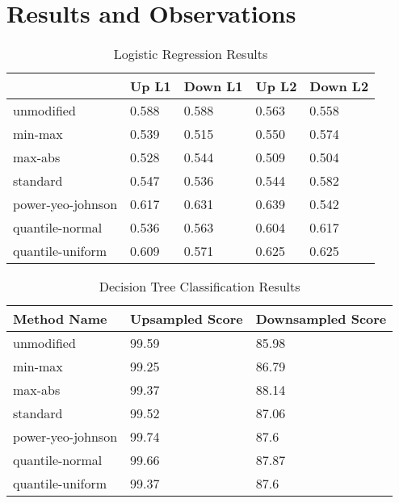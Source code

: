 \chapter{Results and Observations}\label{chp:results-and-observations}
\begin{table}[h!]
\centering
\caption{Logistic Regression Results}
\label{tab:results-log-reg}
\begin{tabular}{@{}lllll@{}}
\toprule
 & Up L1 & Down L1 & Up L2 & Down L2 \\ \midrule
unmodified & 0.588 & 0.588 & 0.563 & 0.558 \\
min-max & 0.539 & 0.515 & 0.550 & 0.574 \\
max-abs & 0.528 & 0.544 & 0.509 & 0.504 \\
standard & 0.547 & 0.536 & 0.544 & 0.582 \\
power-yeo-johnson & 0.617 & 0.631 & 0.639 & 0.542 \\
quantile-normal & 0.536 & 0.563 & 0.604 & 0.617 \\
quantile-uniform & 0.609 & 0.571 & 0.625 & 0.625 \\ \bottomrule
\end{tabular}
\end{table}

\begin{table}[h!]
\centering
\caption{Decision Tree Classification Results}
\label{tab:results-decision-tree}
\begin{tabular}{@{}lll@{}}
\toprule
Method Name & Upsampled Score & Downsampled Score \\ \midrule
unmodified & 99.59 & 85.98 \\
min-max & 99.25 & 86.79 \\
max-abs & 99.37 & 88.14 \\
standard & 99.52 & 87.06 \\
power-yeo-johnson & 99.74 & 87.6 \\
quantile-normal & 99.66 & 87.87 \\
quantile-uniform & 99.37 & 87.6 \\ \bottomrule
\end{tabular}
\end{table}
